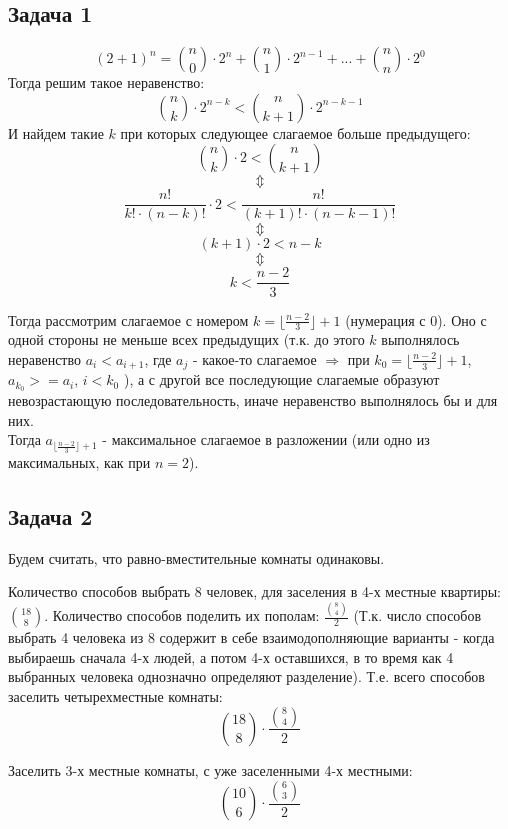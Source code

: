 \documentclass{article}
\begin{document}
\begin{center}
	\subsection*{Задача 1}
\end{center}
	$$ (2 + 1)^n = {n \choose 0} \cdot 2^n + {n \choose 1} \cdot 2^{n - 1} + ... + {n \choose n} \cdot 2^0 $$
	Тогда решим такое неравенство:
	$$ {n \choose k} \cdot 2^{n - k} < {n \choose k + 1} \cdot 2^{n - k - 1}$$
	И найдем такие $k$ при которых следующее слагаемое больше предыдущего:
	$$ {n \choose k} \cdot 2 < {n \choose k + 1}$$
			$$ \Updownarrow $$
	$$ \frac{n!}{k! \cdot (n - k)!} \cdot 2 < \frac{n!}{(k + 1)! \cdot (n - k - 1)!}$$
			$$ \Updownarrow $$
		$$ (k + 1) \cdot 2 < n - k$$
			$$ \Updownarrow $$
		$$ k < \frac{n- 2}{3} $$
	
	Тогда рассмотрим слагаемое с номером $ k = \lfloor \frac{n - 2}{3} \rfloor + 1 $ (нумерация с 0).
	Оно с одной стороны не меньше всех предыдущих (т.к. до этого $k$ выполнялось неравенство $a_i < a_{i + 1}$, где $a_j$ - какое-то слагаемое  $ \Rightarrow$ при $ k_0 = \lfloor \frac{n - 2}{3} \rfloor + 1 $, $a_{k_0} >= a_i$, $i < k_0$ ), а с другой все последующие слагаемые образуют невозрастающую последовательность, иначе неравенство выполнялось бы и для них.
	\\
	Тогда $a_{\lfloor \frac{n - 2}{3} \rfloor + 1 }$ - максимальное слагаемое в разложении (или одно из максимальных, как при $n = 2$).

\begin{center}
	\subsection*{Задача 2}
\end{center}
Будем считать, что равно-вместительные комнаты одинаковы.

Количество способов выбрать 8 человек, для заселения в 4-х местные квартиры: ${18 \choose 8}$. Количество способов поделить их пополам:
$\frac{ {8 \choose 4}}{2} $ (Т.к. число способов выбрать 4 человека из 8 содержит в себе взаимодополняющие варианты - когда выбираешь сначала 4-х людей, а потом 4-х оставшихся, в то время как 4 выбранных человека однозначно определяют разделение). Т.е. всего способов заселить четырехместные комнаты:
$${18 \choose 8} \cdot \frac{ {8 \choose 4}}{2} $$

Заселить 3-х местные комнаты, с уже заселенными 4-х местными:
$${10 \choose 6} \cdot \frac{ {6 \choose 3}}{2} $$
\end{document}
